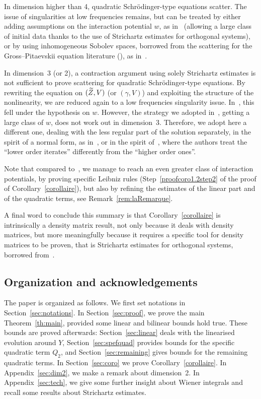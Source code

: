 \documentclass[10pt]{amsart}
\theoremstyle{definition}\newtheorem{defi}[theo]{Definition}\newtheorem{rema}[theo]{Remark}\newtheorem{exam}[theo]{Example}\newtheorem{exem}[theo]{Example}\newtheorem{nota}[theo]{Notation}
\let\oldtilde\tilde
\renewcommand*{\tilde}[1]{\mathchoice{\widetilde{#1}}{\widetilde{#1}}{\oldtilde{#1}}{\oldtilde{#1}}}
\begin{document}
In dimension higher than 4, quadratic Schr\"odinger-type equations scatter. The issue of singularities at low frequencies remains, but can be treated by either adding assumptions on the interaction potential $w$, as in~\cite{CHP2} (allowing a large class of initial data thanks to the use of Strichartz estimates for orthogonal systems), or by using inhomogeneous Sobolev spaces, borrowed from the scattering for the Gross--Pitaevskii equation literature (\cite{GNT}), as in~\cite{CodS}.

In dimension~3 (or 2), a contraction argument using solely Strichartz estimates is not sufficient to prove scattering for quadratic Schr\"odinger-type equations. By rewriting the equation on $(\tilde Z,V)$ (or $(\gamma,V)$) and exploiting the structure of the nonlinearity, we are reduced again to a low frequencies singularity issue. In~\cite{CHP2}, this fell under the hypothesis on $w$. However, the strategy we adopted in~\cite{CodS}, getting a large class of $w$, does not work out in dimension~3. Therefore, we adopt here a different one, dealing with the less regular part of the solution separately, in the spirit of a normal form, as in~\cite{GHN,GNT2,GNT3}, or in the spirit of~\cite{lewsab2}, where the authors treat the ``lower order iterates'' differently from the ``higher order ones''.

Note that compared to~\cite{CodS}, we manage to reach an even greater class of interaction potentials, by proving specific Leibniz rules (Step~\ref{proofcoro1.2step2} of the proof of Corollary~\ref{corollaire}), but also by refining the estimates of the linear part and of the quadratic terms, see Remark~\ref{rem:laRemarque}.

A final word to conclude this summary is that Corollary~\ref{corollaire} is intrinsically a density matrix result, not only because it deals with density matrices, but more meaningfully because it requires a specific tool for density matrices to be proven, that is Strichartz estimates for orthogonal systems, borrowed from~\cite{FS}.



\subsection{Organization and acknowledgements}

The paper is organized as follows. We first set notations in Section~\ref{sec:notations}. In Section~\ref{sec:proof}, we prove the main Theorem~\ref{th:main}, provided some linear and bilinear bounds hold true. These bounds are proved afterwards: Section~\ref{sec:linear} deals with the linearised evolution around $Y$, Section~\ref{sec:spefquad} provides bounds for the specific quadratic term $Q_2$, and Section~\ref{sec:remaining} gives bounds for the remaining quadratic terms. In Section~\ref{sec:coro} we prove Corollary~\ref{corollaire}. In Appendix~\ref{sec:dim2}, we make a remark about dimension~2. In Appendix~\ref{sec:tech}, we give some further insight about Wiener integrals and recall some results about Strichartz estimates.
\end{document}
